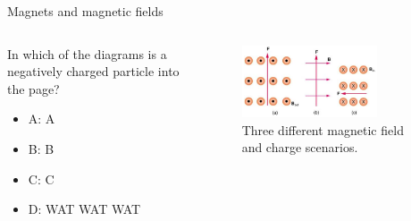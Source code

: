 \documentclass{beamer}
\begin{document}
\begin{frame}{Magnets and magnetic fields}
\begin{columns}[T]
\begin{column}{0.3\textwidth}
In which of the diagrams is a negatively charged particle into the page?
\begin{itemize}
\item A: A
\item B: B
\item C: C
\item D: WAT WAT WAT
\end{itemize}
\end{column}
\begin{column}{0.7\textwidth}
\begin{figure}
\centering
\includegraphics[width=0.75\textwidth]{figures/lorentzProblem.png}
\caption{\label{fig:lorentzProblem4} Three different magnetic field and charge scenarios.}
\end{figure}
\end{column}
\end{columns}
\end{frame}
\end{document}
